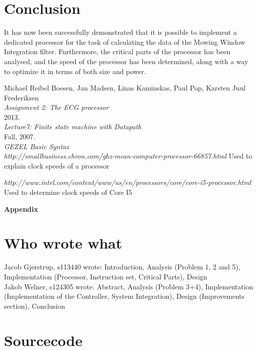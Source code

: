 \documentclass[12pt,a4paper]{article}
\begin{document}
\section{Conclusion}
It has now been successfully demonstrated that it is possible to implement a dedicated processor for the task of calculating the data of the Mowing Window Integration filter. Furthermore, the critical parts of the processor has been analysed, and the speed of the processor has been determined, along with a way to optimize it in terms of both size and power.
\newpage
\begin{thebibliography}{9}

  Michael Reibel Boesen, Jan Madsen, Linas Kaminskas, Paul Pop, Karsten Juul Frederiksen\\
  \emph{Assignment 2: The ECG processor}\\
  2013.\\

  \emph{Lecture7: Finite state machine with Datapath}\\
  Fall, 2007.\\

  \emph{GEZEL Basic Syntax}\\
  
  \emph{http://smallbusiness.chron.com/ghz-mean-computer-processor-66857.html}
  Used to explain clock speeds of a processor
  
  \emph{http://www.intel.com/content/www/us/en/processors/core/core-i5-processor.html}
  Used to determine clock speeds of Core I5
\end{thebibliography}
	
\newpage	
	\begin{Large}
		\textbf{Appendix}
	\end{Large}
	\appendix

\section{Who wrote what}
Jacob Gjerstrup, s113440 wrote: Introduction, Analysis (Problem 1, 2 and 5), Implementation (Processor, Instruction set, Critical Parts), Design\\
Jakob Welner, s124305 wrote: Abstract, Analysis (Problem 3+4), Implementation (Implementation of the Controller, System Integration), Design (Improvements section), Conclusion\\

\section{Sourcecode}
\end{document}
